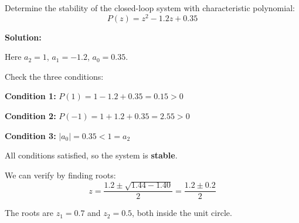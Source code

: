 \begin{example}
\label{ex:jury_second_order}

Determine the stability of the closed-loop system with characteristic polynomial:
\begin{equation}
P(z) = z^2 - 1.2z + 0.35
\end{equation}

\textbf{Solution:}

Here $a_2 = 1$, $a_1 = -1.2$, $a_0 = 0.35$.

Check the three conditions:

\textbf{Condition 1:} $P(1) = 1 - 1.2 + 0.35 = 0.15 > 0$ \checkmark

\textbf{Condition 2:} $P(-1) = 1 + 1.2 + 0.35 = 2.55 > 0$ \checkmark

\textbf{Condition 3:} $|a_0| = 0.35 < 1 = a_2$ \checkmark

All conditions satisfied, so the system is \textbf{stable}.

We can verify by finding roots:
\begin{equation}
z = \frac{1.2 \pm \sqrt{1.44 - 1.40}}{2} = \frac{1.2 \pm 0.2}{2}
\end{equation}

The roots are $z_1 = 0.7$ and $z_2 = 0.5$, both inside the unit circle.
\end{example}

